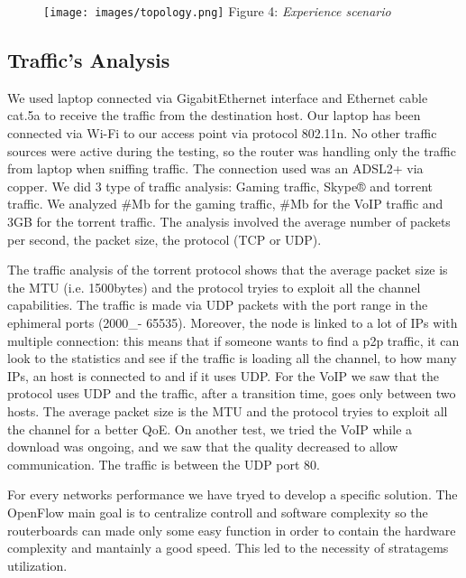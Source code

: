 \documentclass[article,10pt]{IEEEtran}
\begin{document}
  \begin{figure}[!h]
 \centering
 \texttt{[image: images/topology.png]}
 {Figure 4: \emph{Experience scenario}}
 \label{fig:topo}
  \end{figure}
 
 
\subsection{Traffic's Analysis}\label{subsec:traf}
We used laptop connected via
GigabitEthernet interface and Ethernet cable cat.5a to receive the traffic from the destination host.
Our laptop has been connected via Wi-Fi to our access point via protocol 802.11n.
No other traffic sources were active during the testing, so the router was handling only
the traffic from laptop when sniffing traffic. The connection used was an ADSL2+ via copper.
We did 3 type of traffic analysis: Gaming traffic, Skype® and torrent traffic. We analyzed
\#Mb for the gaming traffic, \#Mb for the VoIP traffic and 3GB for the torrent traffic.
The analysis involved the average number of packets per second, the packet size, the protocol (TCP or UDP).

The traffic analysis of the torrent protocol shows that the average packet size is the MTU
(i.e. 1500bytes) and the protocol tryies to exploit all the channel capabilities. The traffic
is made via UDP packets with the port range in the ephimeral ports (2000_- 65535).
Moreover, the node is linked to a lot of IPs with multiple connection: this means that
if someone wants to find a p2p traffic, it can look to the statistics and see if the traffic is loading all the channel,
to how many IPs, an host is connected to and if it uses UDP.
For the VoIP we saw that the protocol uses UDP and the traffic, after a transition time, goes only between two hosts.
The average packet size is the MTU and the protocol tryies to exploit all the channel for a better QoE.
On another test, we tried the VoIP while a download was ongoing, and we saw that the quality
decreased to allow communication. The traffic is between the UDP port 80.

  For every networks performance we have tryed to develop a specific solution. The OpenFlow main goal is to centralize controll and software
  complexity so the routerboards can made only some easy function in order to contain the hardware complexity and mantainly a good speed\cite{qos_paper}.
  This led to the necessity of stratagems utilization.
  
\end{document}
